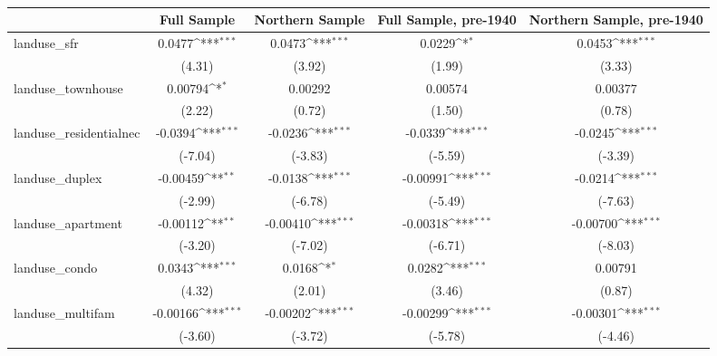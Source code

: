 \begin{table}[htbp]\centering
\def\sym#1{\ifmmode^{#1}\else\(^{#1}\)\fi}
\caption{ \label{tab1}}
\begin{tabular}{l*{4}{c}}
\toprule
                    &\multicolumn{1}{c}{Full Sample}&\multicolumn{1}{c}{Northern Sample}&\multicolumn{1}{c}{Full Sample, pre-1940}&\multicolumn{1}{c}{Northern Sample, pre-1940}\\
\midrule
landuse\_sfr         &      0.0477\sym{***}&      0.0473\sym{***}&      0.0229\sym{*}  &      0.0453\sym{***}\\
                    &      (4.31)         &      (3.92)         &      (1.99)         &      (3.33)         \\
\addlinespace
landuse\_townhouse   &     0.00794\sym{*}  &     0.00292         &     0.00574         &     0.00377         \\
                    &      (2.22)         &      (0.72)         &      (1.50)         &      (0.78)         \\
\addlinespace
landuse\_residentialnec&     -0.0394\sym{***}&     -0.0236\sym{***}&     -0.0339\sym{***}&     -0.0245\sym{***}\\
                    &     (-7.04)         &     (-3.83)         &     (-5.59)         &     (-3.39)         \\
\addlinespace
landuse\_duplex      &    -0.00459\sym{**} &     -0.0138\sym{***}&    -0.00991\sym{***}&     -0.0214\sym{***}\\
                    &     (-2.99)         &     (-6.78)         &     (-5.49)         &     (-7.63)         \\
\addlinespace
landuse\_apartment   &    -0.00112\sym{**} &    -0.00410\sym{***}&    -0.00318\sym{***}&    -0.00700\sym{***}\\
                    &     (-3.20)         &     (-7.02)         &     (-6.71)         &     (-8.03)         \\
\addlinespace
landuse\_condo       &      0.0343\sym{***}&      0.0168\sym{*}  &      0.0282\sym{***}&     0.00791         \\
                    &      (4.32)         &      (2.01)         &      (3.46)         &      (0.87)         \\
\addlinespace
landuse\_multifam    &    -0.00166\sym{***}&    -0.00202\sym{***}&    -0.00299\sym{***}&    -0.00301\sym{***}\\
                    &     (-3.60)         &     (-3.72)         &     (-5.78)         &     (-4.46)         \\

\end{tabular}
\end{table}
